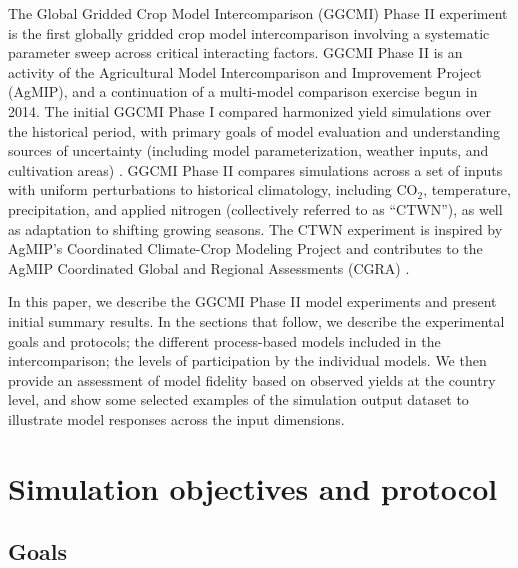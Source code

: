 \documentclass[gmd, manuscript]{copernicus} %
\begin{document}
The Global Gridded Crop Model Intercomparison (GGCMI) Phase II experiment is the first globally gridded crop model intercomparison involving a systematic parameter sweep across critical interacting factors.
GGCMI Phase II is an activity of the Agricultural Model Intercomparison and Improvement Project (AgMIP), 
and a continuation of a multi-model comparison exercise begun in 2014. 
The initial GGCMI Phase I compared harmonized yield simulations over the historical period, with primary goals of model evaluation and understanding sources of uncertainty (including model parameterization, weather inputs, and cultivation areas) \citep{Elliott2015, muller_global_2017, folberth2016, porwollik_spatial_2016}. 
GGCMI Phase II compares simulations across a set of inputs with uniform perturbations to historical climatology,  
including CO$_2$, temperature, precipitation, and applied nitrogen (collectively referred to as ``CTWN''), as well as adaptation to shifting growing seasons. 
The CTWN experiment is inspired by AgMIP's Coordinated Climate-Crop Modeling Project \citep[C3MP][]{ruane2014,mcdermid2015agmip} and contributes to the AgMIP Coordinated Global and Regional Assessments (CGRA) \citep{ruane2018, rosenzweig2018}. 

In this paper, we describe the GGCMI Phase II model experiments and present initial summary results.
In the sections that follow, we describe the experimental goals and protocols; the different process-based models included in the intercomparison; the levels of participation by the individual models. We then provide an assessment of model fidelity based on observed yields at the country level, and show some selected examples of the simulation output dataset to illustrate model responses across the input dimensions.

\section{Simulation objectives and protocol}
\label{S:2}
\subsection{Goals}
\end{document}
